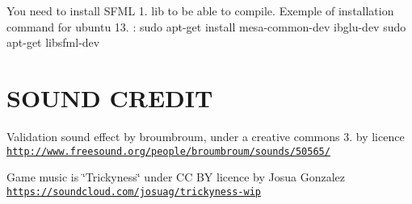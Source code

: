You need to install S\-F\-M\-L 1. lib to be able to compile. Exemple of installation command for ubuntu 13. \-: sudo apt-\/get install mesa-\/common-\/dev ibglu-\/dev sudo apt-\/get libsfml-\/dev

\section*{S\-O\-U\-N\-D C\-R\-E\-D\-I\-T}

Validation sound effect by broumbroum, under a creative commons 3. by licence \href{http://www.freesound.org/people/broumbroum/sounds/50565/}{\tt http\-://www.\-freesound.\-org/people/broumbroum/sounds/50565/}

Game music is \char`\"{}\-Trickyness\char`\"{} under C\-C B\-Y licence by Josua Gonzalez \href{https://soundcloud.com/josuag/trickyness-wip}{\tt https\-://soundcloud.\-com/josuag/trickyness-\/wip} 